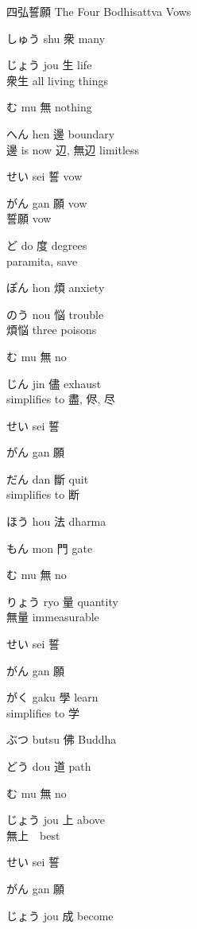 \documentclass[letterpaper]{article}
\newcommand{\kanji}{\centering\fontsize{70}{70}}
\newcommand{\means}{\tcblower\centering}
\newcommand{\heartblock}[3]
{
	\begin{kanjibox}{#1}
		\kanji #2
		\means #3
	\end{kanjibox}
	
}
\begin{document}
	
\centering 四弘誓願 The Four Bodhisattva Vows

\begin{multicols}{4}
\RLmulticolcolumns

\heartblock{しゅう shu}{衆}{many}
\heartblock{じょう jou}{生}{life \\ 衆生 all living things}
\heartblock{む mu}{無}{nothing}
\heartblock{へん hen}{邊}{boundary \\ 邊 is now 辺,  無辺 limitless}
\heartblock{せい sei}{誓}{vow}
\heartblock{がん gan}{願}{vow  \\ 誓願 vow}
\heartblock{ど do}{度}{degrees \\ paramita, save}

\heartblock{ぽん hon}{煩}{anxiety}
\heartblock{のう nou}{悩}{trouble \\ 煩悩 three poisons }
\heartblock{む mu}{無}{no}
\heartblock{じん jin}{儘}{exhaust \\ simplifies to 盡,  侭,  尽}
\heartblock{せい sei}{誓}{}
\heartblock{がん gan}{願}{}
\heartblock{だん dan}{斷}{quit \\ simplifies to 断}

\heartblock{ほう hou}{法}{dharma}
\heartblock{もん mon}{門}{gate}
\heartblock{む mu}{無}{no}
\heartblock{りょう ryo}{量}{quantity \\ 無量 immeasurable}
\heartblock{せい sei}{誓}{}
\heartblock{がん gan}{願}{}
\heartblock{がく gaku}{學}{learn \\ simplifies to 学}

\heartblock{ぶつ butsu}{佛}{Buddha}
\heartblock{どう dou}{道}{path}
\heartblock{む mu}{無}{no}
\heartblock{じょう jou}{上}{above \\ 無上　best}
\heartblock{せい sei}{誓}{}
\heartblock{がん gan}{願}{}
\heartblock{じょう jou}{成}{become}

\end{multicols}
\pagebreak

\renewcommand{\kanji}{\centering\fontsize{50}{50}}
\end{document}
